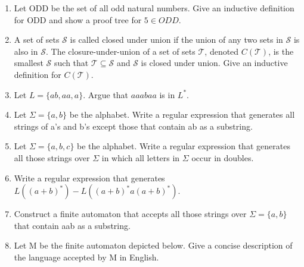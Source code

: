 \documentclass{article}
\begin{document}
\begin{enumerate}
\item Let ODD be the set of all odd natural numbers. Give an
  inductive definition for ODD and show a proof tree for $5\in ODD$.

\pagebreak

\item A set of sets $\mathcal{S}$ is called closed under union if the
  union of any two sets in $\mathcal{S}$ is also in $\mathcal{S}$. The
  closure-under-union of a set of sets $\mathcal{T}$, denoted
  $C(\mathcal{T})$, is the smallest $\mathcal{S}$ such that
  $\mathcal{T}\subseteq\mathcal{S}$ and $\mathcal{S}$ is closed under
  union.  Give an inductive definition for $C(\mathcal{T})$.

\pagebreak


\item Let $L=\{ab,aa,a\}$. Argue that $aaabaa$ is in $L^*$.
\vspace{15pc}


\item Let $\Sigma=\{a,b\}$ be the alphabet. Write a regular
expression that generates all strings of a's and b's except those
that contain ab as a substring. \pagebreak


\item Let $\Sigma=\{a,b,c\}$ be the alphabet. Write a regular
expression that generates all those strings over $\Sigma$ in which
all letters in $\Sigma$ occur in doubles.

\vspace{10pc}

\item Write a regular expression that generates $L((a+b)^*) -
L((a+b)^*a(a+b)^*)$. \vspace{10pc}

\item Construct a finite automaton that accepts all those strings
over $\Sigma=\{a,b\}$ that contain aab as a substring.

\pagebreak

 \item Let M be the  finite automaton depicted below. Give a concise description of the language
 accepted by M in English.


\end{enumerate}
\end{document}
